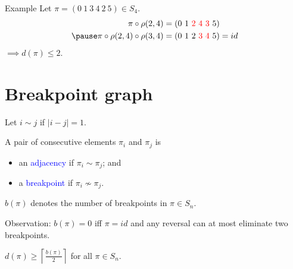 \documentclass{beamer}
\theoremstyle{definition}
\newtheorem{algorithm}[theorem]{Algorithm}
\def\padding{\vspace{0.5cm}}
\def\spadding{\vspace{0.25cm}}
\def\b{\textcolor{blue}}
\def\r{\textcolor{red}}
\begin{document}
\begin{frame}

\begin{exampleblock}{Example}
Let $\pi = (0\ 1\ 3\ 4\ 2\ 5) \in S_4$.\pause
\begin{align*}
    \pi \circ \rho(2,4) &= (0\ 1\ \r{2\ 4\ 3}\ 5) \\ \pause
    \pi \circ \rho(2,4) \circ \rho(3,4) &= (0\ 1\ 2\ \r{3\ 4}\ 5) = id
\end{align*}\pause
$\implies d(\pi) \leq 2$.
\end{exampleblock}



\end{frame}

\section{Breakpoint graph}

\begin{frame}

\begin{definition}
Let $i \sim j$ if $|i - j| = 1$. \par\pause
A pair of consecutive elements $\pi_i$ and $\pi_j$ is
\begin{itemize}
    \item an \b{adjacency} if $\pi_i \sim \pi_j$; and
    \item a \b{breakpoint} if $\pi_i \not\sim \pi_j$.
\end{itemize} \par\pause\spadding
$b(\pi)$ denotes the number of breakpoints in $\pi \in S_n$.
\end{definition}\pause\padding

Observation: $b(\pi) = 0$ iff $\pi = id$ \pause and any reversal can at most eliminate two breakpoints. \pause\spadding

\begin{corollary}
$d(\pi) \geq \left\lceil \frac{b(\pi)}{2} \right\rceil$ for all $\pi \in S_n$.
\end{corollary}

\end{frame}
\end{document}
